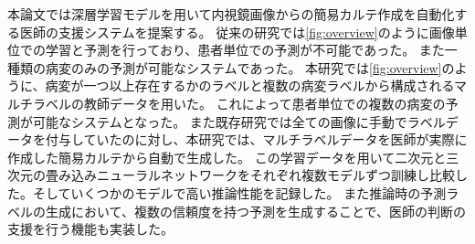 本論文では深層学習モデルを用いて内視鏡画像からの簡易カルテ作成を自動化する医師の支援システムを提案する。
従来の研究では\ref{fig:overview}のように画像単位での学習と予測を行っており、患者単位での予測が不可能であった。
また一種類の病変のみの予測が可能なシステムであった。
本研究では\ref{fig:overview}のように、病変が一つ以上存在するかのラベルと複数の病変ラベルから構成されるマルチラベルの教師データを用いた。
これによって患者単位での複数の病変の予測が可能なシステムとなった。
また既存研究では全ての画像に手動でラベルデータを付与していたのに対し、本研究では、マルチラベルデータを医師が実際に作成した簡易カルテから自動で生成した。
この学習データを用いて二次元と三次元の畳み込みニューラルネットワークをそれぞれ複数モデルずつ訓練し比較した。そしていくつかのモデルで高い推論性能を記録した。
また推論時の予測ラベルの生成において、複数の信頼度を持つ予測を生成することで、医師の判断の支援を行う機能も実装した。
